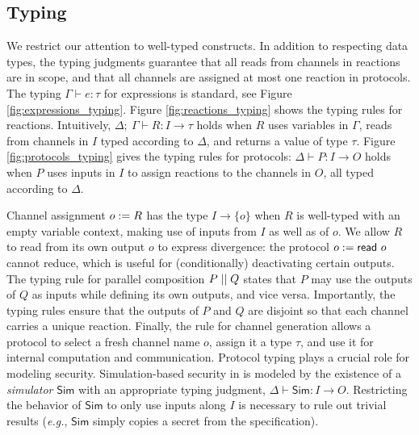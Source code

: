 \subsection{Typing}
We restrict our attention to well-typed \ipdl constructs. In addition to respecting data types, the typing judgments guarantee that all reads from channels in reactions are in scope, and that all channels are assigned at most one reaction in protocols. The typing $\Gamma \vdash e : \tau$ for expressions is standard, see Figure \ref{fig:expressions_typing}. Figure \ref{fig:reactions_typing} shows the typing rules for reactions. Intuitively, $\Delta; \ \Gamma \vdash R : I \to \tau$ holds when $R$ uses variables in $\Gamma$, reads from channels in $I$ typed according to $\Delta$, and returns a value of type $\tau$. Figure \ref{fig:protocols_typing} gives the typing rules for protocols: $\Delta \vdash P : I \to O$ holds when $P$ uses inputs in $I$ to assign reactions to the channels in $O$, all typed according to $\Delta$.

Channel assignment $o := R$ has the type $I \to \{o\}$ 
when $R$ is well-typed with an empty variable context, making use of inputs from $I$ as well as of $o$. We allow $R$ to read from its own output $o$ to express divergence: the protocol $o := \mathsf{read} \ o$ cannot reduce, which is useful for (conditionally) deactivating certain outputs. The typing rule for parallel composition $P \; || \; Q$ states that $P$ may use the outputs of $Q$ as inputs while defining its own outputs, and vice versa. Importantly, the typing rules ensure that the outputs of $P$ and $Q$ are disjoint so that each channel carries a unique reaction. Finally, the rule for channel generation allows a protocol to select a fresh channel name $o$, assign it a type $\tau$, and use it for internal computation and communication. Protocol typing plays a crucial role for modeling security. 
Simulation-based security in \ipdl is modeled by the existence of a \emph{simulator} $\mathsf{Sim}$ with an appropriate typing judgment, $\Delta \vdash \mathsf{Sim} : I \to O$. Restricting the behavior of $\mathsf{Sim}$ to only use inputs along $I$ is necessary to rule out trivial results (\emph{e.g.}, $\mathsf{Sim}$ simply copies a secret from the specification).

